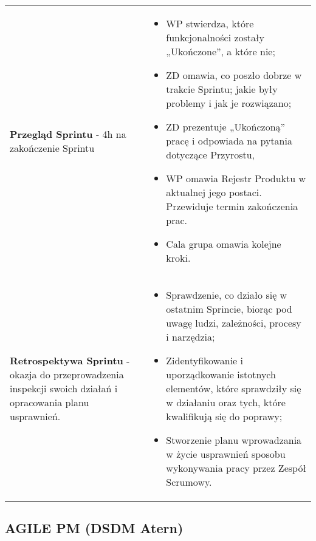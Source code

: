 \documentclass[../main.tex]{subfiles}
\begin{document}
\begin{table}[H]
\begin{center}
\begin{tabular}{ p{} p{} }
                \cmidrule(r){1-1}\cmidrule(l){2-2}
                \textbf{Przegląd Sprintu} - 4h na zakończenie Sprintu
                &
                \begin{itemize}
                    \item WP stwierdza, które funkcjonalności zostały
                    „Ukończone”, a które nie;
                    \item ZD omawia, co poszło dobrze w trakcie
                    Sprintu; jakie były problemy i jak je rozwiązano;
                    \item ZD prezentuje „Ukończoną” pracę i
                    odpowiada na pytania dotyczące Przyrostu,
                    \item WP omawia Rejestr Produktu w aktualnej
                    jego postaci. Przewiduje termin zakończenia prac.
                    \item Cala grupa omawia kolejne kroki.
                \end{itemize}
                \\

                \cmidrule(r){1-1}\cmidrule(l){2-2}
                \textbf{Retrospektywa Sprintu} - okazja do przeprowadzenia inspekcji
                swoich działań i opracowania planu usprawnień.
                &
                \begin{itemize}
                    \item Sprawdzenie, co działo się w ostatnim Sprincie, biorąc pod
                    uwagę ludzi, zależności, procesy i narzędzia;
                    \item Zidentyfikowanie i uporządkowanie istotnych elementów, które
                    sprawdziły się w działaniu oraz tych, które kwalifikują się do
                    poprawy;
                    \item Stworzenie planu wprowadzania w życie usprawnień sposobu
                    wykonywania pracy przez Zespół Scrumowy.
                \end{itemize}
                \\
            \end{tabular}
        \end{center}
    \end{table}


    \subsection{AGILE PM (DSDM Atern)}
\end{document}
